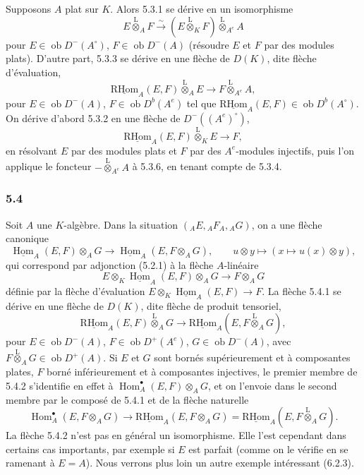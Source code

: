 \documentclass[11pt]{article}
\DeclareMathOperator{\Hom}{Hom}
\newcommand{\R}{\mathrm{R}}\newcommand{\RHomCore}{\mathrm{RHom}}
\newcommand{\ob}{\operatorname{ob}}
\providecommand{\RHom}{\RHomCore}
\providecommand{\uRHom}{\underline{\RHom}}
\providecommand{\uHom}{\underline{\Hom}}
\providecommand{\lten}{\overset{\mathrm L}{\otimes}}
\providecommand{\RHom}{\RHomCore}
\providecommand{\Hom}{\operatorname{Hom}}
\providecommand{\ob}{\operatorname{ob}}
\providecommand{\lten}{\overset{\mathrm L}{\otimes}}
\providecommand{\RHom}{\R\mathcal{H}om}
\providecommand{\lten}{\overset{\mathrm L}{\otimes}}
\providecommand{\R}{\mathrm R}
\providecommand{\lten}{\overset{\mathrm L}{\otimes}}
\providecommand{\lten}{\overset{\mathrm L}{\otimes}}
\providecommand{\lten}{\overset{\mathrm L}{\otimes}}
\providecommand{\RHom}{\RHomCore}
\providecommand{\Hom}{\operatorname{Hom}}
\providecommand{\lten}{\overset{\mathrm L}{\otimes}}
\begin{document}
Supposons $A$ plat sur $K$. Alors 5.3.1 se dérive en un isomorphisme
\begin{equation}\tag{5.3.4}
E\lten_AF\xrightarrow{\sim}(E\lten_KF)\lten_{A^e}A
\end{equation}
pour $E\in\ob D^-(A^\circ)$, $F\in\ob D^-(A)$ (résoudre $E$ et $F$ par des modules plats). D'autre part, 5.3.3 se dérive en une flèche de $D(K)$, dite flèche d'évaluation,
\begin{equation}\tag{5.3.5}
\uRHom_A(E,F)\lten_AE\longrightarrow F\lten_{A^e}A,
\end{equation}
pour $E\in\ob D^-(A)$, $F\in\ob D^b(A^e)$ tel que $\uRHom_A(E,F)\in\ob D^b(A^\circ)$. On dérive d'abord 5.3.2 en une flèche de $D^-((A^e)^\circ)$,
\begin{equation}\tag{5.3.6}
\uRHom_A(E,F)\lten_KE\longrightarrow F,
\end{equation}
en résolvant $E$ par des modules plats et $F$ par des $A^e$-modules injectifs, puis l'on applique le foncteur $-\lten_{A^e}A$ à 5.3.6, en tenant compte de 5.3.4.

\subsubsection*{5.4}

Soit $A$ une $K$-algèbre. Dans la situation $({}_AE,{}_AF_A,{}_AG)$, on a une flèche canonique
\begin{equation}\tag{5.4.1}
\uHom_A(E,F)\otimes_AG\longrightarrow\uHom_A(E,F\otimes_AG),
\qquad u\otimes y\longmapsto(x\longmapsto u(x)\otimes y),
\end{equation}
qui correspond par adjonction (5.2.1) à la flèche $A$-linéaire
\[
E\otimes_K\uHom_A(E,F)\otimes_AG\longrightarrow F\otimes_AG
\]
définie par la flèche d'évaluation $E\otimes_K\uHom_A(E,F)\to F$. La flèche 5.4.1 se dérive en une flèche de $D(K)$, dite flèche de produit tensoriel,
\begin{equation}\tag{5.4.2}
\uRHom_A(E,F)\lten_AG\longrightarrow\uRHom_A(E,F\lten_AG),
\end{equation}
pour $E\in\ob D^-(A)$, $F\in\ob D^+(A^e)$, $G\in\ob D^-(A)$, avec $F\lten_AG\in\ob D^+(A)$. Si $E$ et $G$ sont bornés supérieurement et à composantes plates, $F$ borné inférieurement et à composantes injectives, le premier membre de 5.4.2 s'identifie en effet à $\Hom_A^\bullet(E,F)\otimes_AG$, et on l'envoie dans le second membre par le composé de 5.4.1 et de la flèche naturelle
\[
\Hom_A^\bullet(E,F\otimes_AG)\longrightarrow \uRHom_A(E,F\otimes_AG)=\uRHom_A(E,F\lten_AG).
\]
La flèche 5.4.2 n'est pas en général un isomorphisme. Elle l'est cependant dans certains cas importants, par exemple si $E$ est parfait (comme on le vérifie en se ramenant à $E=A$). Nous verrons plus loin un autre exemple intéressant (6.2.3).
\end{document}
